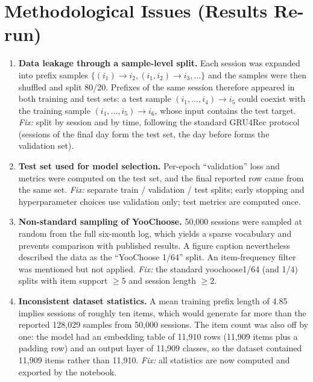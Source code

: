 \documentclass[12pt,a4paper]{report}
\begin{document}
\section{Methodological Issues (Results Re-run)}

\begin{enumerate}[leftmargin=*]
  \item \textbf{Data leakage through a sample-level split.}
        Each session was expanded into prefix samples
        $\{(i_1)\!\to\! i_2, (i_1,i_2)\!\to\! i_3,\ldots\}$ and the samples were
        then shuffled and split 80/20. Prefixes of the same session therefore
        appeared in both training and test sets: a test sample
        $(i_1,\ldots,i_4)\!\to\! i_5$ could coexist with the training sample
        $(i_1,\ldots,i_5)\!\to\! i_6$, whose input contains the test target.
        \emph{Fix:} split by session and by time, following the standard
        GRU4Rec protocol (sessions of the final day form the test set, the day
        before forms the validation set).

  \item \textbf{Test set used for model selection.}
        Per-epoch ``validation'' loss and metrics were computed on the test set,
        and the final reported row came from the same set.
        \emph{Fix:} separate train / validation / test splits; early stopping and
        hyperparameter choices use validation only; test metrics are computed
        once.

  \item \textbf{Non-standard sampling of YooChoose.}
        50{,}000 sessions were sampled at random from the full six-month log,
        which yields a sparse vocabulary and prevents comparison with published
        results. A figure caption nevertheless described the data as the
        ``YooChoose 1/64'' split. An item-frequency filter was mentioned but not
        applied.
        \emph{Fix:} the standard yoochoose1/64 (and 1/4) splits with item support
        $\geq 5$ and session length $\geq 2$.

  \item \textbf{Inconsistent dataset statistics.}
        A mean training prefix length of 4.85 implies sessions of roughly ten
        items, which would generate far more than the reported 128{,}029 samples
        from 50{,}000 sessions. The item count was also off by one: the model had
        an embedding table of 11{,}910 rows (11{,}909 items plus a padding row)
        and an output layer of 11{,}909 classes, so the dataset contained
        11{,}909 items rather than 11{,}910.
        \emph{Fix:} all statistics are now computed and exported by the notebook.


\end{enumerate}
\end{document}

